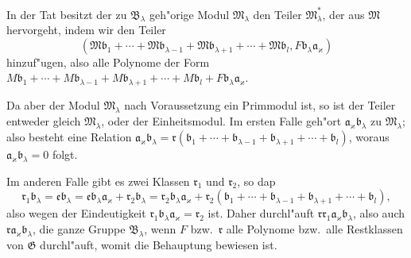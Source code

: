 \documentclass[12pt,a4paper]{article}
\begin{document}
In der Tat besitzt der zu $\mathfrak{B}_\lambda$ geh"orige Modul $\mathfrak{M}_\lambda$ den Teiler $\mathfrak{M}_\lambda^*$, der aus $\mathfrak{M}$ hervorgeht, indem wir den Teiler
\[
(\mathfrak{M}\mathfrak{b}_1 + \cdots + \mathfrak{M}\mathfrak{b}_{\lambda-1} + \mathfrak{M}\mathfrak{b}_{\lambda+1} + \cdots + \mathfrak{M}\mathfrak{b}_l, F\mathfrak{b}_\lambda\mathfrak{a}_\varkappa)
\]
hinzuf"ugen, also alle Polynome der Form $M\mathfrak{b}_1 + \cdots + M\mathfrak{b}_{\lambda-1} + M\mathfrak{b}_{\lambda+1} + \cdots + M\mathfrak{b}_l + F\mathfrak{b}_\lambda\mathfrak{a}_\varkappa$.

Da aber der Modul $\mathfrak{M}_\lambda$ nach Voraussetzung ein Primmodul ist, so ist der Teiler entweder gleich $\mathfrak{M}_\lambda$, oder der Einheitsmodul. Im ersten Falle geh"ort $\mathfrak{a}_\varkappa\mathfrak{b}_\lambda$ zu $\mathfrak{M}_\lambda$; also besteht eine Relation $\mathfrak{a}_\varkappa\mathfrak{b}_\lambda = \mathfrak{r}(\mathfrak{b}_1 + \cdots + \mathfrak{b}_{\lambda-1} + \mathfrak{b}_{\lambda+1} + \cdots + \mathfrak{b}_l)$, woraus $\mathfrak{a}_\varkappa\mathfrak{b}_\lambda = 0$ folgt.

Im anderen Falle gibt es zwei Klassen $\mathfrak{r}_1$ und $\mathfrak{r}_2$, so dap
\[
\mathfrak{r}_1 \mathfrak{b}_\lambda = \mathfrak{e}\mathfrak{b}_\lambda = \mathfrak{e}\mathfrak{b}_\lambda\mathfrak{a}_\varkappa + \mathfrak{r}_2\mathfrak{b}_\lambda = \mathfrak{r}_2\mathfrak{b}_\lambda\mathfrak{a}_\varkappa + \mathfrak{r}_2(\mathfrak{b}_1 + \cdots + \mathfrak{b}_{\lambda-1} + \mathfrak{b}_{\lambda+1} + \cdots + \mathfrak{b}_l),
\]
also wegen der Eindeutigkeit $\mathfrak{r}_1\mathfrak{b}_\lambda\mathfrak{a}_\varkappa = \mathfrak{r}_2$ ist. Daher durchl"auft $\mathfrak{r}\mathfrak{r}_1\mathfrak{a}_\varkappa\mathfrak{b}_\lambda$, also auch $\mathfrak{r}\mathfrak{a}_\varkappa\mathfrak{b}_\lambda$, die ganze Gruppe $\mathfrak{B}_\lambda$, wenn $F$ bzw.\ $\mathfrak{r}$ alle Polynome bzw.\ alle Restklassen von $\mathfrak{G}$ durchl"auft, womit die Behauptung bewiesen ist.
\end{document}
